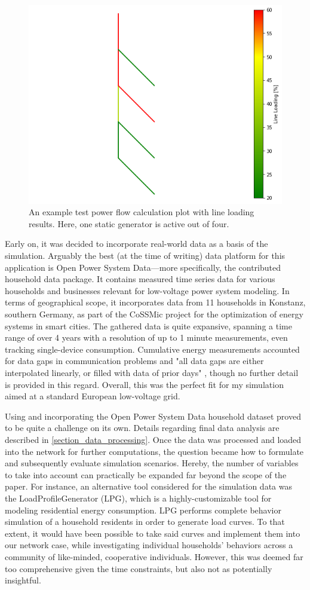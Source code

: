 \documentclass[a4paper,10pt]{report}
\begin{document}
\begin{figure}[htpb]
	\centering
	\includegraphics[width=0.46\linewidth]{test_network}
	\caption{An example test power flow calculation plot with line loading results. Here, one static generator is active out of four.}
	\label{test_network}
\end{figure}

Early on, it was decided to incorporate real-world data as a basis of the simulation. Arguably the best (at the time of writing) data platform for this application is Open Power System Data---more specifically, the contributed household data package. It contains measured time series data for various households and businesses relevant for low-voltage power system modeling. In terms of geographical scope, it incorporates data from 11 households in Konstanz, southern Germany, as part of the CoSSMic project for the optimization of energy systems in smart cities. The gathered data is quite expansive, spanning a time range of over 4 years with a resolution of up to 1 minute measurements, even tracking single-device consumption. Cumulative energy measurements accounted for data gaps in communication problems and "all data gaps are either interpolated linearly, or filled with data of prior days" \cite{OpenPowerSystemData}, though no further detail is provided in this regard. Overall, this was the perfect fit for my simulation aimed at a standard European low-voltage grid.

Using and incorporating the Open Power System Data household dataset proved to be quite a challenge on its own. Details regarding final data analysis are described in \cref{section_data_processing}. Once the data was processed and loaded into the network for further computations, the question became how to formulate and subsequently evaluate simulation scenarios. Hereby, the number of variables to take into account can practically be expanded far beyond the scope of the paper. For instance, an alternative tool considered for the simulation data was the LoadProfileGenerator (LPG), which is a highly-customizable tool for modeling residential energy consumption. LPG performs complete behavior simulation of a household residents in order to generate load curves. To that extent, it would have been possible to take said curves and implement them into our network case, while investigating individual households' behaviors across a community of like-minded, cooperative individuals. However, this was deemed far too comprehensive given the time constraints, but also not as potentially insightful.
\end{document}
